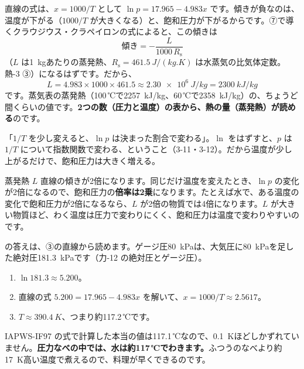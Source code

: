 直線の式は、$x=1000/T$ として $\ln p=17.965-4.983x$ です。傾きが負なのは、温度が下がる（$1000/T$ が大きくなる）と、飽和圧力が下がるからです。⑦で導くクラウジウス・クラペイロンの式によると、この傾きは
\[\text{傾き}=-\frac{L}{1000\,R_{\mathrm s}}\]
（$L$ は\qty{1}{kg}あたりの蒸発熱、$R_{\mathrm s}=\qty{461.5}{J/(kg.K)}$ は水蒸気の比気体定数。熱-3 ③）になるはずです。だから、
\[L=4.983\times1000\times461.5\approx\qty{2.30e6}{J/kg}=\qty{2300}{kJ/kg}\]
です。蒸気表の蒸発熱（100\,℃で\qty{2257}{kJ/kg}、60\,℃で\qty{2358}{kJ/kg}）の、ちょうど間くらいの値です。\textbf{2つの数（圧力と温度）の表から、熱の量（蒸発熱）が読める}のです。

\begin{phyomi}[$\ln p$ と $1/T$ が直線]
「$1/T$ を少し変えると、$\ln p$ は決まった割合で変わる」。$\ln$ をはずすと、$p$ は $1/T$ について指数関数で変わる、ということ（3-11・3-12）。だから温度が少し上がるだけで、飽和圧力は大きく増える。
\end{phyomi}

\begin{phbaisuru}{蒸発熱 $L$}
直線の傾きが2倍になります。同じだけ温度を変えたとき、$\ln p$ の変化が2倍になるので、飽和圧力の\textbf{倍率は2乗}になります。たとえば水で、ある温度の変化で飽和圧力が2倍になるなら、$L$ が2倍の物質では4倍になります。$L$ が大きい物質ほど、わく温度は圧力で変わりにくく、飽和圧力は温度で変わりやすいのです。
\end{phbaisuru}

\label{ph:熱-10:sec4}
\begin{phmodel}[圧力なべの中の水]
\end{phmodel}

\bkhatenaref の答えは、③の直線から読めます。ゲージ圧\qty{80}{kPa}は、大気圧に\qty{80}{kPa}を足した絶対圧\qty{181.3}{kPa}です（力-12 の絶対圧とゲージ圧）。
\begin{enumerate}[label={\bkcircled{\arabic*}}, leftmargin=2.4\zw, itemsep=1pt, topsep=2pt]
\item $\ln181.3\approx5.200$。
\item 直線の式 $5.200=17.965-4.983x$ を解いて、$x=1000/T\approx2.5617$。
\item $T\approx\qty{390.4}{K}$、つまり約117.2\,℃です。
\end{enumerate}
IAPWS-IF97 の式で計算した本当の値は117.1\,℃なので、\qty{0.1}{K}ほどしかずれていません。\textbf{圧力なべの中では、水は約117\,℃でわきます。}ふつうのなべより約\qty{17}{K}高い温度で煮えるので、料理が早くできるのです。

